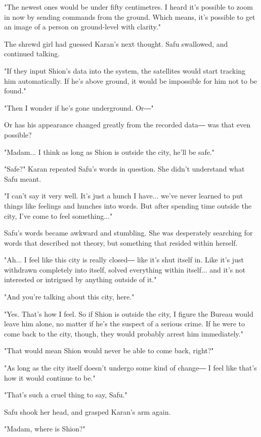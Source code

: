"The newest ones would be under fifty centimetres. I heard it's possible
to zoom in now by sending commands from the ground. Which means, it's
possible to get an image of a person on ground-level with clarity."

The shrewd girl had guessed Karan's next thought. Safu swallowed, and
continued talking.

"If they input Shion's data into the system, the satellites would start
tracking him automatically. If he's above ground, it would be impossible
for him not to be found."

"Then I wonder if he's gone underground. Or―"

Or has his appearance changed greatly from the recorded data― was that
even possible?

"Madam... I think as long as Shion is outside the city, he'll be safe."

"Safe?" Karan repeated Safu's words in question. She didn't understand
what Safu meant.

"I can't say it very well. It's just a hunch I have... we've never
learned to put things like feelings and hunches into words. But after
spending time outside the city, I've come to feel something..."

Safu's words became awkward and stumbling. She was desperately searching
for words that described not theory, but something that resided within
herself.

"Ah... I feel like this city is really closed― like it's shut itself in.
Like it's just withdrawn completely into itself, solved everything
within itself... and it's not interested or intrigued by anything
outside of it."

"And you're talking about this city, here."

"Yes. That's how I feel. So if Shion is outside the city, I figure the
Bureau would leave him alone, no matter if he's the suspect of a serious
crime. If he were to come back to the city, though, they would probably
arrest him immediately."

"That would mean Shion would never be able to come back, right?"

"As long as the city itself doesn't undergo some kind of change― I feel
like that's how it would continue to be."

"That's such a cruel thing to say, Safu."

Safu shook her head, and grasped Karan's arm again.

"Madam, where is Shion?"


